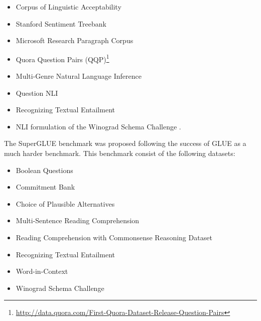 \documentclass[letterpaper, 12pt]{report}
\begin{document}
\begin{itemize}
  \item Corpus of Linguistic Acceptability \citep[CoLA,][]{warstadt-etal-2019-neural}
  \item Stanford Sentiment Treebank \citep[SST,][]{sst2_socher2013recursive}
  \item  Microsoft Research Paragraph Corpus \citep[MRPC,][]{mrpc_dolan2005automatically}
  \item Quora Question Pairs (QQP)\footnote{\href{http://data.quora.com/First-Quora-Dataset-Release-Question-Pairs}{http://data.quora.com/First-Quora-Dataset-Release-Question-Pairs}}
  \item Multi-Genre Natural Language Inference \citep[MNLI,][]{williams-etal-2018-broad}
  \item Question NLI \citep[QNLI,][]{rajpurkar-etal-2016-squad, qnli_2_demszky2018transforming}
  \item Recognizing Textual Entailment \citep[RTE,][]{Dagan2005:RTE, rte2_haim2006second, rte3_giampiccolo2007third, rte5_bentivogli2009fifth}
  \item NLI formulation of the Winograd Schema Challenge \citep[WNLI,][]{Levesque2011:WSC}.
\end{itemize}

\noindent The SuperGLUE benchmark \citep{wang-etal-2019-superglue} was proposed following the success of GLUE as a much harder benchmark. This benchmark consist of the following datasets:

\begin{itemize}
  \item Boolean Questions \citep[BoolQ,][]{clark-etal-2019-boolq}
  \item Commitment Bank \citep[CB,][]{de2019commitmentbank}
  \item Choice of Plausible Alternatives \citep[COPA,][]{roemmele2011choice}
  \item Multi-Sentence Reading Comprehension \citep[MultiRC,][]{khashabi-etal-2018-looking}
  \item Reading Comprehension with Commonsense Reasoning Dataset \citep[ReCoRD,][]{zhang2018record}
  \item Recognizing Textual Entailment \citep[RTE,][]{Dagan2005:RTE, rte2_haim2006second, rte3_giampiccolo2007third, rte5_bentivogli2009fifth}
  \item Word-in-Context \citep[WiC,][]{pilehvar-camacho-collados-2019-wic}
  \item Winograd Schema Challenge \citep[WSC,][]{Levesque2011:WSC}
\end{itemize}
\end{document}
